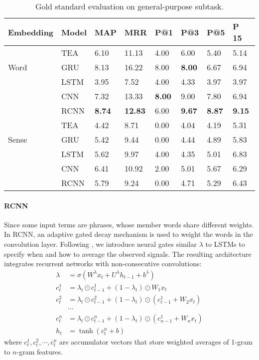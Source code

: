 \documentclass[11pt,a4paper]{article}
\begin{document}
	\begin{table*}[t]\centering \small
		{
			\begin{tabular}{l|l|l|l|l|l|l|l}
				\hline
				\hline
				Embedding &	Model & MAP  &  MRR  & P@1 & P@3 & P@5 & P 15 \\
				\hline
				\multirow{3}{*}{Word}  
				& TEA  &  6.10 &  11.13 &  4.00 &  6.00 &  5.40 &  5.14  \\
				& GRU  &  8.13 &  16.22 &  8.00 &  \textbf{8.00} &  6.67 &  6.94  \\
				& LSTM &  3.95 &  7.52 &  4.00 &  4.33 &  3.97 &  3.97  \\
				& CNN  &  7.32 &  13.33 &  \textbf{8.00} &  9.00 &  7.80 &  6.94  \\
				& RCNN &  \textbf{8.74} &  \textbf{12.83} &  6.00 &  \textbf{9.67} &  \textbf{8.87} &  \textbf{9.15}  \\
				\hline
				\multirow{3}{*}{Sense} 
				& TEA &  4.42 &  8.71 &  0.00 &  4.04 &  4.19 &  5.31  \\
				& GRU  &  5.42 &  9.44 &  0.00 &  4.44 &  4.89 &  5.83  \\
				& LSTM &  5.62 &  9.97 &  4.00 &  4.35 &  5.01 &  6.83  \\
				& CNN  &  6.41 &  10.92 &  2.00 &  5.01 &  5.67 &  6.29  \\
				& RCNN &  5.79 &  9.24 &  0.00 &  4.71 &  5.29 &  6.43  \\
				\hline
				\hline
			\end{tabular}
			
		}
		\caption{\label{tab:result_sense_word} Gold standard
			evaluation on general-purpose subtask.}
	\end{table*}
	
\paragraph{RCNN}
Since some input terms are phrases, whose member words share different weights. In RCNN, an adaptive gated decay mechanism is used to weight the words in the convolution layer. Following \cite{Lei:2016}, we introduce neural gates similar $\lambda$ to LSTMs
to specify when and how to average the observed signals. The resulting architecture integrates recurrent  networks with  non-consecutive  convolutions:
\begin{align*}
\lambda & = \sigma (W^{\lambda}x_{t}+U^{\lambda}h_{t-1}+b^{\lambda}) \\
c_{t}^{1} & =\lambda_{t} \odot c_{t-1}^{1} + (1-\lambda_{t})\odot W_{1}x_{t} \\
c_{t}^{2} & =\lambda_{t} \odot c_{t-1}^{2} + (1-\lambda_{t})\odot (c_{t-1}^{1} + W_{2}x_{t}) \\
& \cdots \\ 
c_{t}^{n} & =\lambda_{t} \odot c_{t-1}^{n} + (1-\lambda_{t})\odot (c_{n-1}^{1} + W_{n}x_{t}) \\
h_{t} & = \tanh(c_{t}^{n}+b)
\end{align*}
where $c_t^{1}, c_t^{2}, \cdots, c_t^{n}$ are accumulator vectors that store weighted averages of 1-gram to $n$-gram features.
\end{document}
